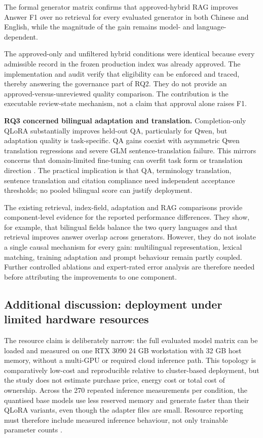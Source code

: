 The formal generator matrix confirms that approved-hybrid RAG improves Answer F1 over no retrieval for every evaluated generator in both Chinese and English, while the magnitude of the gain remains model- and language-dependent.

The approved-only and unfiltered hybrid conditions were identical because every admissible record in the frozen production index was already approved. The implementation and audit verify that eligibility can be enforced and traced, thereby answering the governance part of RQ2. They do not provide an approved-versus-unreviewed quality comparison. The contribution is the executable review-state mechanism, not a claim that approval alone raises F1.

\textbf{RQ3 concerned bilingual adaptation and translation.} Completion-only QLoRA substantially improves held-out QA, particularly for Qwen, but adaptation quality is task-specific. QA gains coexist with asymmetric Qwen translation regressions and severe GLM sentence-translation failure. This mirrors concerns that domain-limited fine-tuning can overfit task form or translation direction \citep{hu2024translation,vieira2024translation}. The practical implication is that QA, terminology translation, sentence translation and citation compliance need independent acceptance thresholds; no pooled bilingual score can justify deployment.

The existing retrieval, index-field, adaptation and RAG comparisons provide component-level evidence for the reported performance differences. They show, for example, that bilingual fields balance the two query languages and that retrieval improves answer overlap across generators. However, they do not isolate a single causal mechanism for every gain: multilingual representation, lexical matching, training adaptation and prompt behaviour remain partly coupled. Further controlled ablations and expert-rated error analysis are therefore needed before attributing the improvements to one component.

\subsection{Additional discussion: deployment under limited hardware resources}

The resource claim is deliberately narrow: the full evaluated model matrix can be loaded and measured on one RTX 3090 24 GB workstation with 32 GB host memory, without a multi-GPU or required cloud inference path. This topology is comparatively low-cost and reproducible relative to cluster-based deployment, but the study does not estimate purchase price, energy cost or total cost of ownership. Across the 270 repeated inference measurements per condition, the quantised base models use less reserved memory and generate faster than their QLoRA variants, even though the adapter files are small. Resource reporting must therefore include measured inference behaviour, not only trainable parameter counts \citep{schwartz2020green,ding2023peft,lv2024full}.

